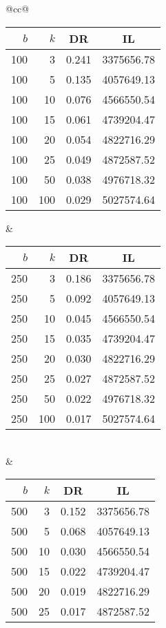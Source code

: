 \begin{table}[H]
	\centering
	\begin{tabular}{@{}cc@{}}
		\begin{tabular}{@{}rrrr@{}}
			\toprule
			$b$ & $k$ & \multicolumn{1}{c}{DR} & \multicolumn{1}{c}{IL} \\ \midrule
			100  & 3   & 0.241 & 3375656.78 \\
			100  & 5   & 0.135 & 4057649.13 \\
			100  & 10  & 0.076 & 4566550.54 \\
			100  & 15  & 0.061 & 4739204.47 \\
			100  & 20  & 0.054 & 4822716.29 \\
			100  & 25  & 0.049 & 4872587.52 \\
			100  & 50  & 0.038 & 4976718.32 \\
			100  & 100 & 0.029 & 5027574.64 \\ \bottomrule
		\end{tabular}
		&
		\begin{tabular}{@{}rrrr@{}}
			\toprule
			$b$ & $k$ & \multicolumn{1}{c}{DR} & \multicolumn{1}{c}{IL} \\ \midrule
			250  & 3   & 0.186 & 3375656.78 \\
			250  & 5   & 0.092 & 4057649.13 \\
			250  & 10  & 0.045 & 4566550.54 \\
			250  & 15  & 0.035 & 4739204.47 \\
			250  & 20  & 0.030 & 4822716.29 \\
			250  & 25  & 0.027 & 4872587.52 \\
			250  & 50  & 0.022 & 4976718.32 \\
			250  & 100 & 0.017 & 5027574.64 \\ \bottomrule
		\end{tabular}
		\\ & \\
		\begin{tabular}{@{}rrrr@{}}
			\toprule
			$b$ & $k$ & \multicolumn{1}{c}{DR} & \multicolumn{1}{c}{IL} \\ \midrule
			500  & 3   & 0.152 & 3375656.78 \\
			500  & 5   & 0.068 & 4057649.13 \\
			500  & 10  & 0.030 & 4566550.54 \\
			500  & 15  & 0.022 & 4739204.47 \\
			500  & 20  & 0.019 & 4822716.29 \\
			500  & 25  & 0.017 & 4872587.52 \\

\end{tabular}
\end{tabular}
\end{table}

